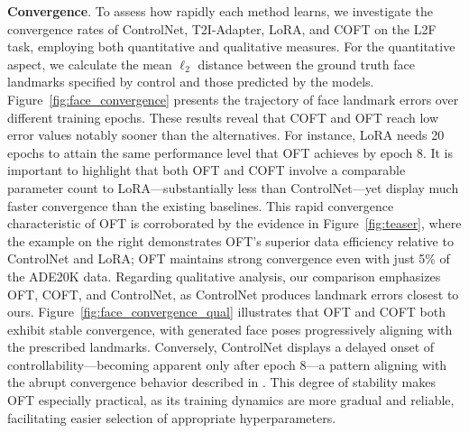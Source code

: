 \textbf{Convergence}. To assess how rapidly each method learns, we investigate the convergence rates of ControlNet, T2I-Adapter, LoRA, and COFT on the L2F task, employing both quantitative and qualitative measures. For the quantitative aspect, we calculate the mean $\ell_2$ distance between the ground truth face landmarks specified by control and those predicted by the models. Figure~\ref{fig:face_convergence} presents the trajectory of face landmark errors over different training epochs. These results reveal that COFT and OFT reach low error values notably sooner than the alternatives. For instance, LoRA needs 20 epochs to attain the same performance level that OFT achieves by epoch 8. It is important to highlight that both OFT and COFT involve a comparable parameter count to LoRA—substantially less than ControlNet—yet display much faster convergence than the existing baselines. This rapid convergence characteristic of OFT is corroborated by the evidence in Figure~\ref{fig:teaser}, where the example on the right demonstrates OFT's superior data efficiency relative to ControlNet and LoRA; OFT maintains strong convergence even with just 5\% of the ADE20K data. Regarding qualitative analysis, our comparison emphasizes OFT, COFT, and ControlNet, as ControlNet produces landmark errors closest to ours. Figure~\ref{fig:face_convergence_qual} illustrates that OFT and COFT both exhibit stable convergence, with generated face poses progressively aligning with the prescribed landmarks. Conversely, ControlNet displays a delayed onset of controllability—becoming apparent only after epoch 8—a pattern aligning with the abrupt convergence behavior described in \cite{zhang2023adding}. This degree of stability makes OFT especially practical, as its training dynamics are more gradual and reliable, facilitating easier selection of appropriate hyperparameters.

